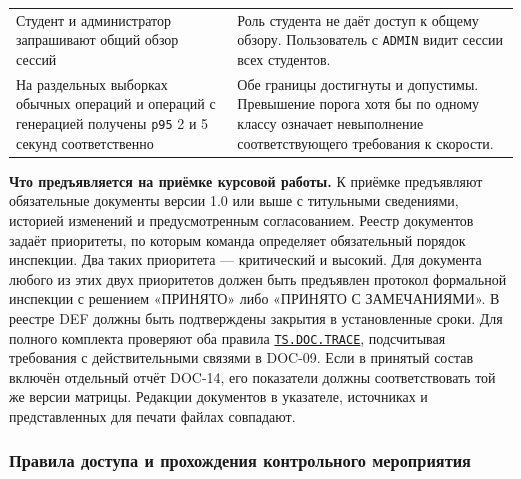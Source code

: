 \documentclass[12pt,a4paper]{article}
\begin{document}
{\begin{longtable}[]{@{}
  >{\raggedright\arraybackslash}p{}
  >{\raggedright\arraybackslash}p{}@{}}
Студент и администратор запрашивают общий обзор сессий & Роль студента не даёт доступ к общему обзору. Пользователь с \texttt{ADMIN} видит сессии всех студентов. \\
На раздельных выборках обычных операций и операций с генерацией получены \texttt{p95} 2 и 5 секунд соответственно & Обе границы достигнуты и допустимы. Превышение порога хотя бы по одному классу означает невыполнение соответствующего требования к скорости. \\
\end{longtable}
}

\textbf{Что предъявляется на приёмке курсовой работы.} К приёмке предъявляют обязательные документы версии 1.0 или выше с титульными сведениями, историей изменений и предусмотренным согласованием. Реестр документов задаёт приоритеты, по которым команда определяет обязательный порядок инспекции. Два таких приоритета --- критический и высокий. Для документа любого из этих двух приоритетов должен быть предъявлен протокол формальной инспекции с решением «ПРИНЯТО» либо «ПРИНЯТО С ЗАМЕЧАНИЯМИ». В реестре DEF должны быть подтверждены закрытия в установленные сроки. Для полного комплекта проверяют оба правила {\hyperlink{ts-doc-trace}{\texttt{TS.\allowbreak{}DOC.\allowbreak{}TRACE}}}, подсчитывая требования с действительными связями в DOC-09. Если в принятый состав включён отдельный отчёт DOC-14, его показатели должны соответствовать той же версии матрицы. Редакции документов в указателе, источниках и представленных для печати файлах совпадают.

\subsubsection{Правила доступа и прохождения контрольного мероприятия}\label{ux43fux440ux430ux432ux438ux43bux430-ux434ux43eux441ux442ux443ux43fux430-ux438-ux43fux440ux43eux445ux43eux436ux434ux435ux43dux438ux44f-ux43aux43eux43dux442ux440ux43eux43bux44cux43dux43eux433ux43e-ux43cux435ux440ux43eux43fux440ux438ux44fux442ux438ux44f}

\hypertarget{правила-доступа-и-прохождения-контрольного-мероприятия}{}
\end{document}
